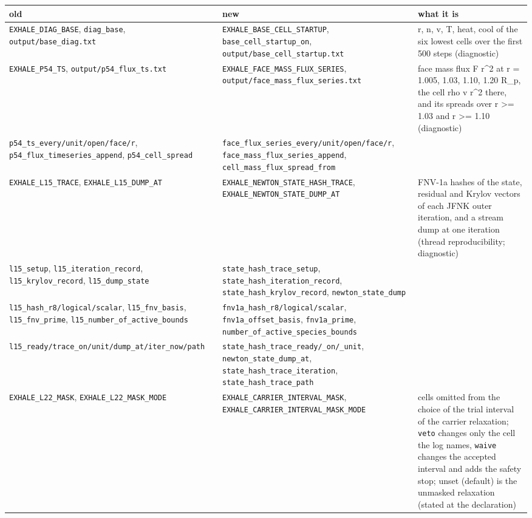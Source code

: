 \documentclass[english,a4paper]{my_memo}
\begin{document}
{\def\LTcaptype{none} %
{\small
\begin{longtable}[]{@{}lll@{}}
\toprule\noalign{}
old & new & what it is \\
\midrule\noalign{}
\endhead
\bottomrule\noalign{}
\endlastfoot
\texttt{EXHALE\_DIAG\_BASE}, \texttt{diag\_base}, \texttt{output/base\_diag.txt} & \texttt{EXHALE\_BASE\_CELL\_STARTUP}, \texttt{base\_cell\_startup\_on}, \texttt{output/base\_cell\_startup.txt} & r, n, v, T, heat, cool of the six lowest cells over the first 500 steps (diagnostic) \\
\texttt{EXHALE\_P54\_TS}, \texttt{output/p54\_flux\_ts.txt} & \texttt{EXHALE\_FACE\_MASS\_FLUX\_SERIES}, \texttt{output/face\_mass\_flux\_series.txt} & face mass flux F r\^{}2 at r = 1.005, 1.03, 1.10, 1.20 R\_p, the cell rho v r\^{}2 there, and its spreads over r \textgreater= 1.03 and r \textgreater= 1.10 (diagnostic) \\
\texttt{p54\_ts\_every/unit/open/face/r}, \texttt{p54\_flux\_timeseries\_append}, \texttt{p54\_cell\_spread} & \texttt{face\_flux\_series\_every/unit/open/face/r}, \texttt{face\_mass\_flux\_series\_append}, \texttt{cell\_mass\_flux\_spread\_from} & \\
\texttt{EXHALE\_L15\_TRACE}, \texttt{EXHALE\_L15\_DUMP\_AT} & \texttt{EXHALE\_NEWTON\_STATE\_HASH\_TRACE}, \texttt{EXHALE\_NEWTON\_STATE\_DUMP\_AT} & FNV-1a hashes of the state, residual and Krylov vectors of each JFNK outer iteration, and a stream dump at one iteration (thread reproducibility; diagnostic) \\
\texttt{l15\_setup}, \texttt{l15\_iteration\_record}, \texttt{l15\_krylov\_record}, \texttt{l15\_dump\_state} & \texttt{state\_hash\_trace\_setup}, \texttt{state\_hash\_iteration\_record}, \texttt{state\_hash\_krylov\_record}, \texttt{newton\_state\_dump} & \\
\texttt{l15\_hash\_r8/logical/scalar}, \texttt{l15\_fnv\_basis}, \texttt{l15\_fnv\_prime}, \texttt{l15\_number\_of\_active\_bounds} & \texttt{fnv1a\_hash\_r8/logical/scalar}, \texttt{fnv1a\_offset\_basis}, \texttt{fnv1a\_prime}, \texttt{number\_of\_active\_species\_bounds} & \\
\texttt{l15\_ready/trace\_on/unit/dump\_at/iter\_now/path} & \texttt{state\_hash\_trace\_ready/\_on/\_unit}, \texttt{newton\_state\_dump\_at}, \texttt{state\_hash\_trace\_iteration}, \texttt{state\_hash\_trace\_path} & \\
\texttt{EXHALE\_L22\_MASK}, \texttt{EXHALE\_L22\_MASK\_MODE} & \texttt{EXHALE\_CARRIER\_INTERVAL\_MASK}, \texttt{EXHALE\_CARRIER\_INTERVAL\_MASK\_MODE} & cells omitted from the choice of the trial interval of the carrier relaxation; \texttt{veto} changes only the cell the log names, \texttt{waive} changes the accepted interval and adds the safety stop; unset (default) is the unmasked relaxation (stated at the declaration) \\

\end{longtable}}}
\end{document}

